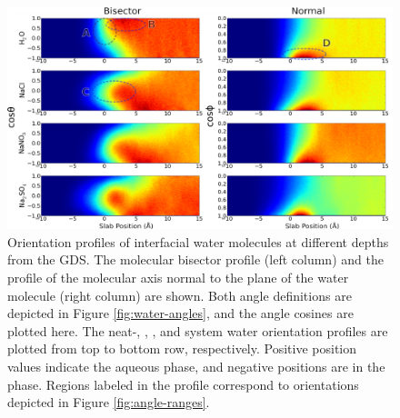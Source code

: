 \begin{figure}[h!]
\begin{center}
	\includegraphics[scale=1.0]{images/h2o-2dhistograms.png}
	\caption{Orientation profiles of interfacial water molecules at different depths from the GDS. The molecular bisector profile (left column) and the profile of the molecular axis normal to the plane of the water molecule (right column) are shown. Both angle definitions are depicted in Figure \ref{fig:water-angles}, and the angle cosines are plotted here. The neat-\ctcwat, \nacl, \sodnit, and \sodsul system water orientation profiles are plotted from top to bottom row, respectively. Positive position values indicate the aqueous phase, and negative positions are in the \ctc phase. Regions labeled in the profile correspond to orientations depicted in Figure \ref{fig:angle-ranges}.}
	\label{fig:2dhisto}
\end{center}
\end{figure}


